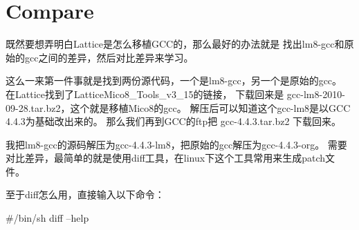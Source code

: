 \clearpage
\section{Compare}
既然要想弄明白Lattice是怎么移植GCC的，那么最好的办法就是
找出lm8-gcc和原始的gcc之间的差异，然后对比差异来学习。

这么一来第一件事就是找到两份源代码，一个是lm8-gcc，另一个是原始的gcc。
在Lattice找到了LatticeMico8\_Tools\_v3\_15的链接，
下载回来是 gcc-lm8-2010-09-28.tar.bz2，这个就是移植Mico8的gcc。
解压后可以知道这个gcc-lm8是以GCC 4.4.3为基础改出来的。
那么我们再到GCC的ftp把 gcc-4.4.3.tar.bz2 下载回来。

我把lm8-gcc的源码解压为gcc-4.4.3-lm8，把原始的gcc解压为gcc-4.4.3-org。
需要对比差异，最简单的就是使用diff工具，在linux下这个工具常用来生成patch文件。

至于diff怎么用，直接输入以下命令：
\begin{shcode}
#/bin/sh
diff --help
\end{shcode}

